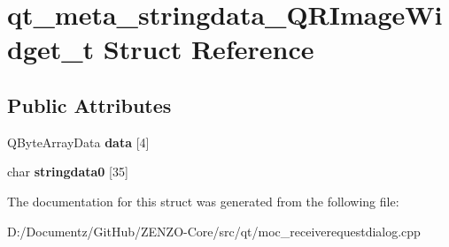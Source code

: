 \hypertarget{structqt__meta__stringdata___q_r_image_widget__t}{}\section{qt\+\_\+meta\+\_\+stringdata\+\_\+\+Q\+R\+Image\+Widget\+\_\+t Struct Reference}
\label{structqt__meta__stringdata___q_r_image_widget__t}
\subsection*{Public Attributes}
\begin{DoxyCompactItemize}
\item 
\mbox{\label{structqt__meta__stringdata___q_r_image_widget__t_a96983efb43060e1839ad9303b68208f0}} 
Q\+Byte\+Array\+Data {\bfseries data} \mbox{[}4\mbox{]}
\item 
\mbox{\label{structqt__meta__stringdata___q_r_image_widget__t_af8de56a0217f8b9aa0f92bf21b490495}} 
char {\bfseries stringdata0} \mbox{[}35\mbox{]}
\end{DoxyCompactItemize}


The documentation for this struct was generated from the following file\+:\begin{DoxyCompactItemize}
\item 
D\+:/\+Documentz/\+Git\+Hub/\+Z\+E\+N\+Z\+O-\/\+Core/src/qt/moc\+\_\+receiverequestdialog.\+cpp\end{DoxyCompactItemize}
